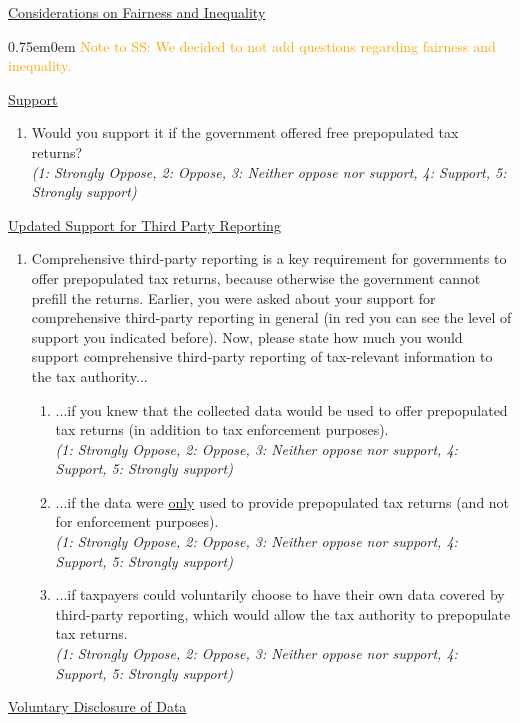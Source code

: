 \documentclass[11pt]{article}
\newcommand{\tk}[1]{\textcolor{orange}{#1}}
\begin{document}
\underline{Considerations on Fairness and Inequality}
\vspace{0.5em}
\begin{adjustwidth}{0.75em}{0em} \tk{Note to SS: We decided to not add questions regarding fairness and inequality.} \end{adjustwidth} 
\underline{Support}
\begin{enumerate}[resume]
    \item Would you support it if the government offered free prepopulated tax returns?\\
    \textit{(1: Strongly Oppose, 2: Oppose, 3: Neither oppose nor support, 4: Support, 5: Strongly support)}
\end{enumerate}
\underline{Updated Support for Third Party Reporting} \\
\begin{enumerate}[resume]
    \item Comprehensive third-party reporting is a key requirement for governments to offer prepopulated tax returns, because otherwise the government cannot prefill the returns. Earlier, you were asked about your support for comprehensive third-party reporting in general (in red you can see the level of support you indicated before). Now, please state how much you would support comprehensive third-party reporting of tax-relevant information to the tax authority... 
    \begin{enumerate}
    \item ...if you knew that the collected data would be used to offer prepopulated tax returns (in addition to tax enforcement purposes).\\ \textit{(1: Strongly Oppose, 2: Oppose, 3: Neither oppose nor support, 4: Support, 5: Strongly support)}  
    \item ...if the data were \underline{only} used to provide prepopulated tax returns (and not for enforcement purposes).\\ \textit{(1: Strongly Oppose, 2: Oppose, 3: Neither oppose nor support, 4: Support, 5: Strongly support)}
    \item ...if taxpayers could voluntarily choose to have their own data covered by third-party reporting, which would allow the tax authority to prepopulate tax returns. \\
    \textit{(1: Strongly Oppose, 2: Oppose, 3: Neither oppose nor support, 4: Support, 5: Strongly support)}
\end{enumerate}
\end{enumerate}
\underline{Voluntary Disclosure of Data} \\
\end{document}
